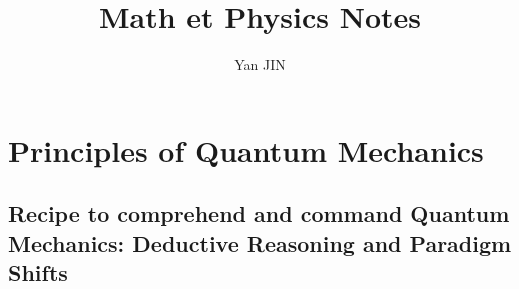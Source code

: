 \documentclass[12pt]{article}
\numberwithin{equation}{section}
\begin{document}
\small
\title{Math et Physics Notes}
\author{Yan JIN}
\pagestyle{fancy}\fancyhf{}
\lhead{}
\lfoot{\textit{}}\cfoot{}\rfoot{\thepage}
\renewcommand{\headrulewidth}{1.pt}
\renewcommand{\footrulewidth}{1.pt}
\maketitle
\tableofcontents
\section{Principles of Quantum Mechanics}
\subsection{Recipe to comprehend and command Quantum Mechanics: Deductive Reasoning and  Paradigm Shifts}
\end{document}
